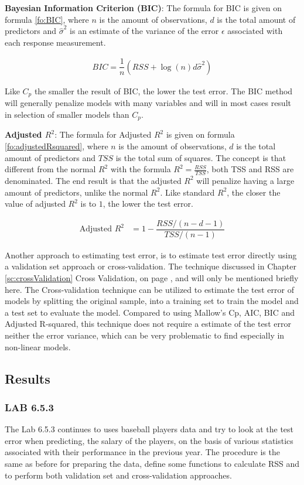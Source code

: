 \textbf{Bayesian Information Criterion (BIC)}: The formula for BIC is given on formula \ref{fo:BIC}, where $n$ is the amount of observations, $d$ is the total amount of predictors and $\hat{\sigma}^2$ is an estimate of the variance of the error $\epsilon$ associated with each response measurement.

\begin{align}\label{fo:BIC}
BIC = \dfrac{1}{n} (RSS + \log(n) d \hat{\sigma}^2)
\end{align}

Like $C_p$ the smaller the result of BIC, the lower the test error. The BIC method will generally penalize models with many variables and will in most cases result in selection of smaller models than $C_p$.

\textbf{Adjusted $R^2$}: The formula for Adjusted $R^2$ is given on formula \ref{fo:adjustedRsquared}, where $n$ is the amount of observations, $d$ is the total amount of predictors and $TSS$ is the total sum of squares. The concept is that different from the normal $R^2$ with the formula $R^2 = \tfrac{RSS}{TSS}$, both TSS and RSS  are denominated. The end result is that the adjusted $R^2$ will penalize having a large amount of predictors, unlike the normal $R^2$. Like standard $R^2$, the closer the value of adjusted $R^2$ is to $1$, the lower the test error.

\begin{align}\label{fo:adjustedRsquared}
	\text{Adjusted } R^2 &= 1 - \dfrac{RSS/(n-d-1)}{TSS/(n-1)}
\end{align}

Another approach to estimating test error, is to estimate test error directly using a validation set approach or cross-validation. The technique discussed in Chapter \ref{sc:crossValidation} Cross Validation, on page \pageref{sc:crossValidation}, and will only be mentioned briefly here. The Cross-validation technique can be utilized to estimate the test error of models by splitting the original sample, into a training set to train the model and a test set to evaluate the model. Compared to using Mallow's Cp, AIC, BIC and Adjusted R-squared, this technique does not require a estimate of the test error neither the error variance, which can be very problematic to find especially in non-linear models.

\subsection{Results}
\subsubsection*{LAB 6.5.3}%
The Lab 6.5.3 continues to uses baseball players data and try to look at the test error when predicting, the salary of the players, on the basis of various statistics associated with their performance in the previous year. The procedure is the same as before for preparing the data, define some functions to calculate RSS and to perform both validation set and cross-validation approaches.

